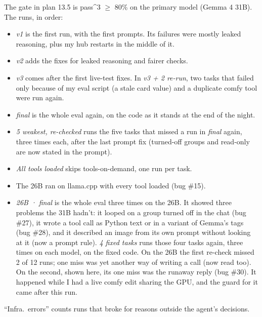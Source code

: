 \documentclass[10.5pt,a4paper]{article}
\begin{document}
\medskip
The gate in plan 13.5 is pass\textasciicircum{}3 $\geq$ 80\% on the primary model (Gemma 4 31B). The runs, in order:
\begin{itemize}[leftmargin=*]
\item \emph{v1} is the first run, with the first prompts. Its failures were mostly leaked reasoning, plus my hub restarts in the middle of it.
\item \emph{v2} adds the fixes for leaked reasoning and fairer checks.
\item \emph{v3} comes after the first live-test fixes. In \emph{v3 + 2 re-run}, two tasks that failed only because of my eval script (a stale card value) and a duplicate comfy tool were run again.
\item \emph{final} is the whole eval again, on the code as it stands at the end of the night.
\item \emph{5 weakest, re-checked} runs the five tasks that missed a run in \emph{final} again, three times each, after the last prompt fix (turned-off groups and read-only are now stated in the prompt).
\item \emph{All tools loaded} skips tools-on-demand, one run per task.
\item The 26B ran on llama.cpp with every tool loaded (bug \#15).
\item \emph{26B · final} is the whole eval three times on the 26B. It showed three problems the 31B hadn't: it looped on a group turned off in the chat (bug \#27), it wrote a tool call as Python text or in a variant of Gemma's tags (bug \#28), and it described an image from its own prompt without looking at it (now a prompt rule). \emph{4 fixed tasks} runs those four tasks again, three times on each model, on the fixed code. On the 26B the first re-check missed 2 of 12 runs; one miss was yet another way of writing a call (now read too). On the second, shown here, its one miss was the runaway reply (bug \#30). It happened while I had a live comfy edit sharing the GPU, and the guard for it came after this run.
\end{itemize}
``Infra.\ errors'' counts runs that broke for reasons outside the agent's decisions.
\end{document}

